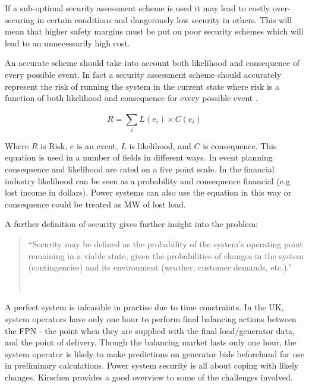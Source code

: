 \documentclass[a4paper,oneside,12pt]{report}
\newcommand{\tmpquotecite}{}%
\newenvironment{myquote}[1][]
{\renewcommand{\tmpquotecite}{#1}\begin{quote}\begin{itshape}``}
{''\end{itshape}~{\normalfont~\tmpquotecite}\end{quote}}
\begin{document}
If a sub-optimal security assessment scheme is used it may lead to costly over-securing in certain conditions and dangerously low security in others. This will mean that higher safety margins must be put on poor security schemes which will lead to an unnecessarily high cost.

An accurate scheme should take into account both likelihood and consequence of every possible event. In fact a security assessment scheme should accurately represent the risk of running the system in the current state where risk is a function of both likelihood and consequence for every possible event \cite{Billinton1997}.

\begin{equation}
  \label{eqn_risk}
  R = \sum\limits_{i}^{} L (e_i) \times C(e_i)
\end{equation}


Where $R$ is Risk, $e$ is an event, $L$ is likelihood, and $C$ is consequence. This equation is used in a number of fields in different ways. In event planning consequence and likelihood are rated on a five point scale. In the financial industry likelihood can be seen as a probability and consequence financial (e.g lost income in dollars). Power systems can also use the equation in this way or consequence could be treated as MW of lost load.


A further definition of security \cite{Balu1992} gives further insight into the problem:

\begin{myquote}[\cite{Balu1992}]Security may be defined as the probability of the system's operating point remaining in a viable state, given the probabilities of changes in the system (contingencies) and its environment (weather, customer demands, etc.).\end{myquote}

A perfect system is infeasible in practise due to time constraints. In the UK, system operators have only one hour to perform final balancing actions between the FPN - the point when they are supplied with the final load/generator data, and the point of delivery. Though the balancing market lasts only one hour, the system operator is likely to make predictions on generator bids beforehand for use in preliminary calculations. Power system security is all about coping with likely changes. Kirschen \cite{Kirschen2002} provides a good overview to some of the challenges involved.
\end{document}
